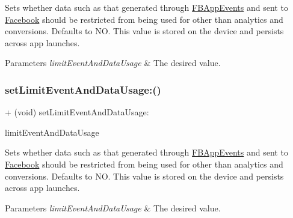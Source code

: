 Sets whether data such as that generated through \hyperlink{interfaceFBAppEvents}{F\+B\+App\+Events} and sent to \hyperlink{interfaceFacebook}{Facebook} should be restricted from being used for other than analytics and conversions. Defaults to NO. This value is stored on the device and persists across app launches.


\begin{DoxyParams}{Parameters}
{\em limit\+Event\+And\+Data\+Usage} & The desired value. \\
\hline
\end{DoxyParams}
\mbox{\label{interfaceFBSettings_ab0e8e19825a865db7cbf58da4957cf40}} 
\subsubsection{\texorpdfstring{set\+Limit\+Event\+And\+Data\+Usage\+:()}{setLimitEventAndDataUsage:()}\hspace{0.1cm}{\footnotesize\ttfamily [3/5]}}
{\footnotesize\ttfamily + (void) set\+Limit\+Event\+And\+Data\+Usage\+: \begin{DoxyParamCaption}\item[{(B\+O\+OL)}]{limit\+Event\+And\+Data\+Usage }\end{DoxyParamCaption}}

Sets whether data such as that generated through \hyperlink{interfaceFBAppEvents}{F\+B\+App\+Events} and sent to \hyperlink{interfaceFacebook}{Facebook} should be restricted from being used for other than analytics and conversions. Defaults to NO. This value is stored on the device and persists across app launches.


\begin{DoxyParams}{Parameters}
{\em limit\+Event\+And\+Data\+Usage} & The desired value. \\
\hline
\end{DoxyParams}
\mbox{\label{interfaceFBSettings_ab0e8e19825a865db7cbf58da4957cf40}} 
